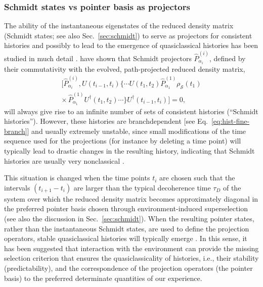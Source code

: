 \documentclass[twocolumn,rmp,aps,amsmath,amsfonts,noshowkeys,noshowpacs]{revtex4}
\begin{document}
\subsubsection{Schmidt states vs pointer basis as projectors}

The ability of the instantaneous eigenstates of the reduced density
matrix (Schmidt states; see also Sec.~\ref{sec:schmidt}) to serve as
projectors for consistent histories and possibly to lead to the
emergence of quasiclassical histories has been studied in much detail
\citep{Albrecht:1992:rz,Albrecht:1993:pq,Zurek:1993:pu,Paz:1993:ww,Kent:1997:oz}.
\citet{Paz:1993:ww} have shown that Schmidt projectors
$\widehat{P}^{(i)}_{\alpha_i}$, defined by their commutativity with
the evolved, path-projected reduced density matrix, 
%
\begin{multline} 
\big[\widehat{P}^{(i)}_{\alpha_i}, U(t_{i-1},t_i) \{ \cdots
U(t_1,t_2) \widehat{P}^{(1)}_{\alpha_1} \rho_\mathcal{S}(t_1)
\\ \times \, \widehat{P}^{(1)}_{\alpha_1} U^\dagger(t_1,t_2) \cdots \}
U^\dagger(t_{i-1},t_i)\big] = 0, 
\end{multline}
%
will always give rise to an infinite number of sets of consistent
histories (``Schmidt histories''). However, these histories are
branchdependent [see Eq.~\eqref{eq:hist-fine-branch}] and usually
extremely unstable, since small modifications of the time sequence
used for the projections (for instance by deleting a time point) will
typically lead to drastic changes in the resulting history, indicating
that Schmidt histories are usually very nonclassical
\citep{Zurek:1993:pu,Paz:1993:ww}.

This situation is changed when the time points $t_i$ are chosen such
that the intervals $(t_{i+1}-t_i)$ are larger than the typical
decoherence time $\tau_D$ of the system over which the reduced density
matrix becomes approximately diagonal in the preferred pointer basis
chosen through environment-induced superselection (see also the
discussion in Sec.~\ref{sec:schmidt}). When the resulting pointer
states, rather than the instantaneous Schmidt states, are used to
define the projection operators, stable quasiclassical histories will
typically emerge \citep{Zurek:1993:pu,Paz:1993:ww}.  In this sense, it
has been suggested that interaction with the environment can
provide the missing selection criterion that ensures the
quasiclassicality of histories, i.e., their stability (predictability),
and the correspondence of the projection operators (the pointer basis)
to the preferred determinate quantities of our experience.
\end{document}
